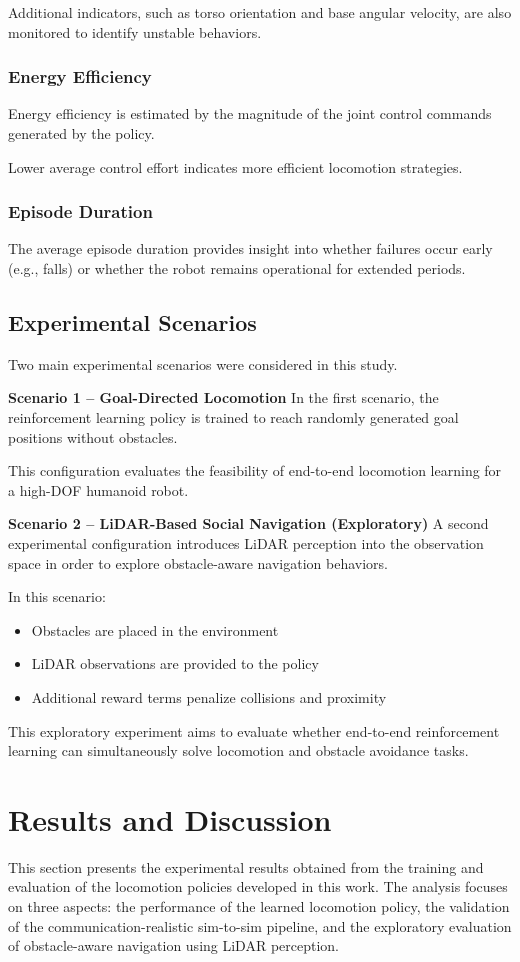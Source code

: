\documentclass[pdflatex,sn-mathphys-num]{sn-jnl}%
\theoremstyle{thmstyleone}%
\theoremstyle{thmstyletwo}%
\theoremstyle{thmstylethree}%
\begin{document}
Additional indicators, such as torso orientation and base angular velocity, are also monitored to identify unstable behaviors.

\subsubsection{Energy Efficiency}
Energy efficiency is estimated by the magnitude of the joint control commands generated by the policy.

Lower average control effort indicates more efficient locomotion strategies.

\subsubsection{Episode Duration}
The average episode duration provides insight into whether failures occur early (e.g., falls) or whether the robot remains operational for extended periods.

\subsection{Experimental Scenarios}
Two main experimental scenarios were considered in this study.

\textbf{Scenario 1 – Goal-Directed Locomotion}
In the first scenario, the reinforcement learning policy is trained to reach randomly generated goal positions without obstacles.

This configuration evaluates the feasibility of end-to-end locomotion learning for a high-DOF humanoid robot.

\textbf{Scenario 2 – LiDAR-Based Social Navigation (Exploratory)}
A second experimental configuration introduces LiDAR perception into the observation space in order to explore obstacle-aware navigation behaviors.

In this scenario:
\begin{itemize}
    \item Obstacles are placed in the environment
    \item LiDAR observations are provided to the policy
    \item Additional reward terms penalize collisions and proximity
\end{itemize} 

This exploratory experiment aims to evaluate whether end-to-end reinforcement learning can simultaneously solve locomotion and obstacle avoidance tasks.

\section{Results and Discussion}
\label{results}
This section presents the experimental results obtained from the training and evaluation of the locomotion policies developed in this work. The analysis focuses on three aspects: the performance of the learned locomotion policy, the validation of the communication-realistic sim-to-sim pipeline, and the exploratory evaluation of obstacle-aware navigation using LiDAR perception.
\end{document}
